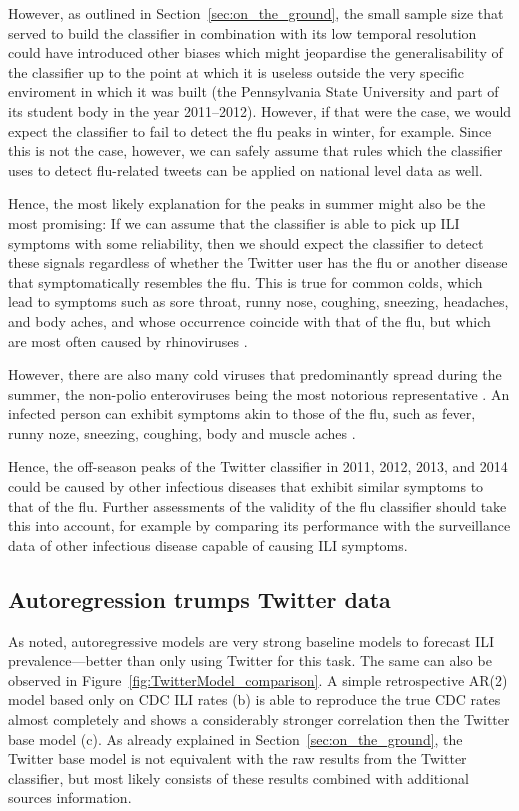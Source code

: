 \documentclass[11pt, a4paper,twoside]{report}\usepackage[]{graphicx}\usepackage[]{color}
\begin{document}
However, as outlined in Section~\ref{sec:on_the_ground}, the small sample size that served to build the classifier in combination with its low temporal resolution could have introduced other biases which might jeopardise the generalisability of the classifier up to the point at which it is useless outside the very specific enviroment in which it was built (the Pennsylvania State University and part of its student body in the year 2011--2012). However, if that were the case, we would expect the classifier to fail to detect the flu peaks in winter, for example. Since this is not the case, however, we can safely assume that rules which the classifier uses to detect flu-related tweets can be applied on national level data as well. 

Hence, the most likely explanation for the peaks in summer might also be the most promising: If we can assume that the classifier is able to pick up ILI symptoms with some reliability, then we should expect the classifier to detect these signals regardless of whether the Twitter user has the flu or another disease that symptomatically resembles the flu. This is true for common colds, which lead to symptoms such as sore throat, runny nose, coughing, sneezing, headaches, and body aches, and whose occurrence coincide with that of the flu, but which are most often caused by rhinoviruses \citep{heikkinen2003common,cdc_rhinovirus_2017}. 

However, there are also many cold viruses that predominantly spread during the summer, the non-polio enteroviruses being the most notorious representative  \citep{pons2015epidemiology}. An infected person can exhibit symptoms akin to those of the flu, such as fever, runny noze, sneezing, coughing, body and muscle aches \citep{pons2015epidemiology,cdc_enterovirus_2016}.

Hence, the off-season peaks of the Twitter classifier in 2011, 2012, 2013, and 2014 could be caused by other infectious diseases that exhibit similar symptoms to that of the flu. Further assessments of the validity of the flu classifier should take this into account, for example by comparing its performance with the surveillance data of other infectious disease capable of causing ILI symptoms.

\subsection{Autoregression trumps Twitter data}
As \cite{paul_twitter_2014} noted, autoregressive models are very strong baseline models to forecast ILI prevalence---better than only using Twitter for this task. The same can also be observed in Figure~\ref{fig:TwitterModel_comparison}. A simple retrospective AR(2) model based only on CDC ILI rates (b) is able to reproduce the true CDC rates almost completely and shows a considerably stronger correlation then the Twitter base model (c). As already explained in Section~\ref{sec:on_the_ground}, the Twitter base model is not equivalent with the raw results from the Twitter classifier, but most likely consists of these results combined with additional sources information. 
\end{document}
